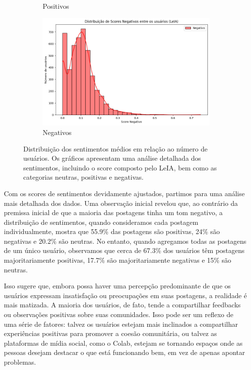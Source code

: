 \begin{figure}[htbp]
\begin{subfigure}{0.45\textwidth}
		\caption{Positivos}
		\label{fig:imagem3}
	\end{subfigure}
	\hfill
	\begin{subfigure}{0.45\textwidth}
		\includegraphics[width=\linewidth]{images/average_negative_by_number_of_users.png}
		\caption{Negativos}
		\label{fig:average_negative_by_number_of_users}
	\end{subfigure}
	\caption{Distribuição dos sentimentos médios em relação ao número de usuários. Os gráficos apresentam uma análise detalhada dos sentimentos, incluindo o score composto pelo LeIA, bem como as categorias neutras, positivas e negativas.}
	\label{fig:average_sentiment_by_number_of_users}
\end{figure}

Com os scores de sentimentos devidamente ajustados, partimos para uma análise mais detalhada dos dados. Uma observação inicial revelou que, ao contrário da premissa inicial de que a maioria das postagens tinha um tom negativo, a distribuição de sentimentos, quando consideramos cada postagem individualmente, mostra que 55.9\% das postagens são positivas, 24\% são negativas e 20.2\% são neutras. No entanto, quando agregamos todas as postagens de um único usuário, observamos que cerca de 67.3\% dos usuários têm postagens majoritariamente positivas, 17.7\% são majoritariamente negativas e 15\% são neutras.

Isso sugere que, embora possa haver uma percepção predominante de que os usuários expressam insatisfação ou preocupações em suas postagens, a realidade é mais matizada. A maioria dos usuários, de fato, tende a compartilhar feedbacks ou observações positivas sobre suas comunidades. Isso pode ser um reflexo de uma série de fatores: talvez os usuários estejam mais inclinados a compartilhar experiências positivas para promover a coesão comunitária, ou talvez as plataformas de mídia social, como o Colab, estejam se tornando espaços onde as pessoas desejam destacar o que está funcionando bem, em vez de apenas apontar problemas.

